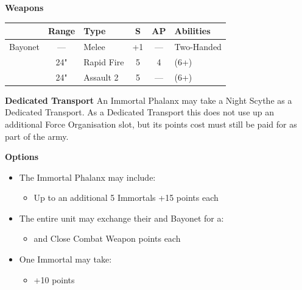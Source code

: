 \begin{minipage}[t]{0.72\textwidth}
	\vspace*{2em}
	\textbf{Weapons}
	
	\begin{tabular}{L{90 pt} c C{40pt} *{2}{c} >{\raggedright\arraybackslash}p{130pt}}
		& Range & Type & S & AP & Abilities \\
		\hline
		Bayonet & — & Melee & +1 & — & Two-Handed \\
		 & 24" & Rapid Fire & 5 & 4 &  (6+)  \\
		 & 24" & Assault 2 & 5 & — &  (6+)  \\
	\end{tabular}
	
	\vspace*{2em}
	\textbf{Dedicated Transport}
	An Immortal Phalanx may take a Night Scythe as a Dedicated Transport. As a Dedicated Transport this does not use up an additional Force Organisation slot, but its points cost must still be paid for as part of the army.
	
	\vspace*{2em}
	\textbf{Options}
	\begin{itemize}
		\item The Immortal Phalanx may include:
		\begin{itemize}
			\item Up to an additional 5 Immortals \dotfill +15 points each
		\end{itemize}
		\item The entire unit may exchange their  and Bayonet for a:
		\begin{itemize}
			\item {} and Close Combat Weapon points each
		\end{itemize}
		\item One Immortal may take:
		\begin{itemize}
			\item {} \dotfill +10 points
		\end{itemize} 
	\end{itemize}
\end{minipage}
\hspace{0.5em}
